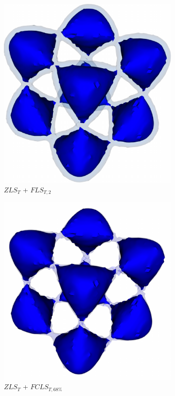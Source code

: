 \begin{figure}[t]
\begin{subfigure}{0.195\linewidth}
\centering
\includegraphics[width=0.8\linewidth]{Images/Tangle/fls.pdf}
\caption{$ZLS_{T}$ + $FLS_{T,2}$}
\label{}
\end{subfigure}
\begin{subfigure}{0.195\linewidth}
\centering
\includegraphics[width=0.8\linewidth]{Images/Tangle/fcls_68.pdf}
\caption{$ZLS_{T}$ + $FCLS_{T,68\%}$}
\label{}
\end{subfigure}
\begin{subfigure}{0.195\linewidth}

\end{subfigure}
\end{figure}
